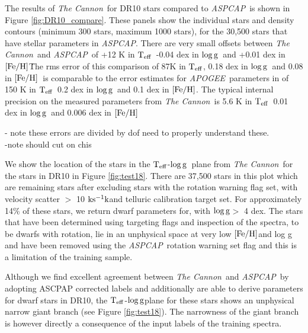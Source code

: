\documentclass[12pt, preprint]{aastex}
\newcommand{\teff}{\mbox{$\rm T_{eff}$}}
\newcommand{\kms}{\mbox{$\rm ks^{-1} k$}}
\newcommand{\feh}{\mbox{$\rm [Fe/H]$}}
\newcommand{\logg}{\mbox{$\rm \log g$}}
\newcommand{\tc}{\textsl{The Cannon}}
\newcommand{\apogee}{\textsl{APOGEE}}
\newcommand{\aspcap}{\textsl{ASPCAP}}
\begin{document}
The results of \tc\ for DR10 stars compared to \aspcap\ is shown in Figure \ref{fig:DR10_compare}. These panels show the individual stars and density contours  (minimum 300 stars, maximum 1000 stars), for the 30,500 stars that have stellar parameters in \textit{ASPCAP}. There are very small offsets between \tc\ and \aspcap\ of +12 K in \teff\, -0.04 dex in \logg\ and +0.01 dex in \feh\. The rms error of this comparison of 87K in \teff, 0.18 dex in \logg\ and 0.08 in \feh\ is comparable to the error estimates for \apogee\ parameters in \citet{Meszaros2013} of 150 K in \teff\, 0.2 dex in \logg\ and 0.1 dex in \feh.  The typical internal precision on the measured parameters from \tc\ is 5.6 K in \teff\, 0.01 dex in \logg\ and 0.006 dex in \feh\ 

- note these errors are divided by dof need to properly understand these. \\

-note should cut on chis



We show the location of the stars in the \teff-\logg\ plane from \tc\ for the stars in DR10 in Figure \ref{fig:test18}. There are 37,500 stars in this plot which are remaining stars after excluding stars with the  rotation warning flag set, with velocity scatter $>$ 10 \kms and telluric calibration target set. For approximately 14\% of these stars, we return dwarf parameters for, with \logg $>$ 4 dex.  The stars that have been determined using targeting flags and inspection of the spectra, to be dwarfs with rotation, lie in an unphysical space at very low \feh and log g and have been removed using the \aspcap\ rotation warning set flag and this is a limitation of the training sample. 

Although we find excellent agreement between \tc\ and \aspcap\ by adopting ASCPAP corrected labels and additionally are able to derive parameters for dwarf stars in DR10, the \teff-\logg plane for these stars shows an unphysical narrow giant branch  (see Figure \ref{fig:test18}). The narrowness of the giant branch is however directly a consequence of the input labels of the training spectra. 

\end{document}

